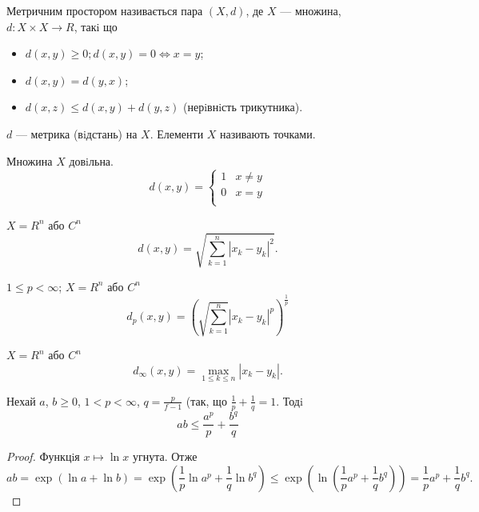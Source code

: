 \begin{definition}
    Метричним простором називається пара $(X, d)$, де $X$ ---
    множина, $d : X \times X \rightarrow R$, такi що
    \begin{itemize}
        \item $d(x, y) \geqslant 0; d(x, y) = 0 \Leftrightarrow x = y$;
        \item $d(x, y) = d(y, x)$;
        \item $d(x, z) \leqslant d(x, y) + d(y, z)$ (нерiвнiсть трикутника).
    \end{itemize}
    $d$ --- метрика (вiдстань) на $X$. Елементи $X$ називають точками.
\end{definition}

\begin{example}
    Множина $X$ довiльна.
    $$d(x, y) = \left\{ \begin{array}{ll}
        1 & x \neq y \\
        0 & x = y \\
    \end{array} \right.$$
\end{example}

\begin{example}
    $X = R^n$ або $C^n$
    $$d(x, y) = \sqrt{\sum\limits_{k=1}^n |x_k - y_k|^2}.$$
\end{example}

\begin{example}
    $1 \leqslant p < \infty$; $X = R^n$ або $C^n$
    $$d_p(x, y) =  \left( \sqrt{\sum\limits_{k=1}^{n}} |x_k - y_k|^p \right)^{\frac{1}{p}}$$
\end{example}

\begin{example}
    $X = R^n$ або $C^n$
    $$d_{\infty}(x, y) = \max\limits_{1 \leqslant k \leqslant n} |x_k - y_k|.$$
\end{example}

\begin{claim}
\end{claim}
Нехай $a$, $b \geqslant 0$, $1 < p < \infty$, $q = \frac{p}{f-1}$ (так,
що $\frac{1}{p} + \frac{1}{q} = 1$. Тодi
$$ab \leqslant \frac{a^p}{p} + \frac{b^q}{q}$$
\begin{proof}
    Функцiя $x \mapsto \ln x$ угнута. Отже
    $$ab = \exp(\ln a + \ln b) = \exp \left( \frac{1}{p} \ln a^p + \frac{1}{q} \ln b^q \right)
    \leqslant \exp \left( \ln \left( \frac{1}{p} a^p + \frac{1}{q} b^q \right) \right)
    = \frac{1}{p} a^p + \frac{1}{q} b^q.$$
\end{proof}

